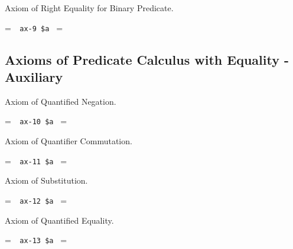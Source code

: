 \noindent Axiom of Right Equality for Binary Predicate.

\setbox\startprefix=\hbox{\tt \ \ ax-9\ \$a\ }
\setbox\contprefix=\hbox{\tt \ \ \ \ \ \ \ \ \ \ \ }
\startm
\m{\vdash}\m{(}\m{=}\m{\rightarrow}\m{(}\m{\in}\m{
\rightarrow}\m{\in}\m{)}\m{)}
\endm


\subsection{Axioms of Predicate Calculus with Equality - Auxiliary}

\noindent Axiom of Quantified Negation.

\setbox\startprefix=\hbox{\tt \ \ ax-10\ \$a\ }
\setbox\contprefix=\hbox{\tt \ \ \ \ \ \ \ \ \ \ }
\startm
\m{\vdash}\m{(}\m{\lnot}\m{\forall}\m{\lnot}\m{\forall}\m{\varphi}\m{
\rightarrow}\m{\varphi}\m{)}
\endm

\noindent Axiom of Quantifier Commutation.

\setbox\startprefix=\hbox{\tt \ \ ax-11\ \$a\ }
\setbox\contprefix=\hbox{\tt \ \ \ \ \ \ \ \ \ \ }
\startm
\m{\vdash}\m{(}\m{\forall}\m{\forall}\m{\varphi}\m{\rightarrow}\m{
\forall}\m{\forall}\m{\varphi}\m{)}
\endm


\noindent Axiom of Substitution.

\setbox\startprefix=\hbox{\tt \ \ ax-12\ \$a\ }
\setbox\contprefix=\hbox{\tt \ \ \ \ \ \ \ \ \ \ \ }
\startm
\m{\vdash}\m{(}\m{\lnot}\m{\forall}\m{=}\m{\rightarrow}\m{(}
\m{=}\m{\rightarrow}\m{(}\m{\varphi}\m{\rightarrow}\m{\forall}\m{(}
\m{=}\m{\rightarrow}\m{\varphi}\m{)}\m{)}\m{)}\m{)}
\endm

\noindent Axiom of Quantified Equality.

\setbox\startprefix=\hbox{\tt \ \ ax-13\ \$a\ }
\setbox\contprefix=\hbox{\tt \ \ \ \ \ \ \ \ \ \ \ }
\startm
\m{\vdash}\m{(}\m{\lnot}\m{\forall}\m{=}\m{\rightarrow}\m{(}
\m{\lnot}\m{\forall}\m{=}\m{\rightarrow}\m{(}\m{=}
\m{\rightarrow}\m{\forall}\m{=}\m{)}\m{)}\m{)}
\endm

%
%
%
%

